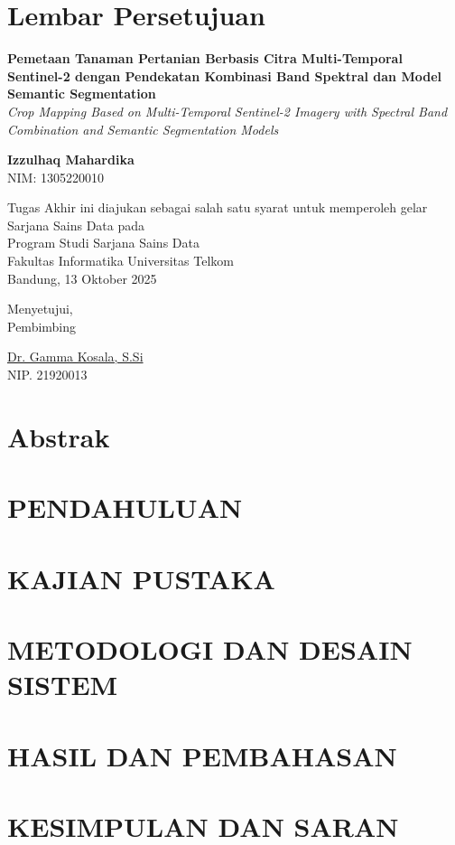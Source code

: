 \documentclass[12pt,a4paper]{report}
\begin{document}
\chapter*{Lembar Persetujuan}
\begin{center}
    \textbf{Pemetaan Tanaman Pertanian Berbasis Citra Multi-Temporal Sentinel-2 dengan Pendekatan Kombinasi Band Spektral dan Model Semantic Segmentation}
    \\
    \textit{Crop Mapping Based on Multi-Temporal Sentinel-2 Imagery with Spectral Band Combination and Semantic Segmentation Models}
    \vspace{1cm}
    
    \textbf{Izzulhaq Mahardika}\\
    NIM: 1305220010
    \vspace{1cm}
    
    Tugas Akhir ini diajukan sebagai salah satu syarat untuk memperoleh gelar Sarjana Sains Data pada\\
    Program Studi Sarjana Sains Data\\
    Fakultas Informatika Universitas Telkom\\
    Bandung, 13 Oktober 2025
    \vspace{1cm}
    
    Menyetujui,\\
    Pembimbing
    \vspace{2cm}
    
    \underline{Dr. Gamma Kosala, S.Si}\\
    NIP. 21920013
\end{center}

\chapter*{Abstrak}


\tableofcontents
\listoftables
\listoffigures

\chapter{PENDAHULUAN}


\chapter{KAJIAN PUSTAKA}


\chapter{METODOLOGI DAN DESAIN SISTEM}


\chapter{HASIL DAN PEMBAHASAN}


\chapter{KESIMPULAN DAN SARAN}




\end{document}
